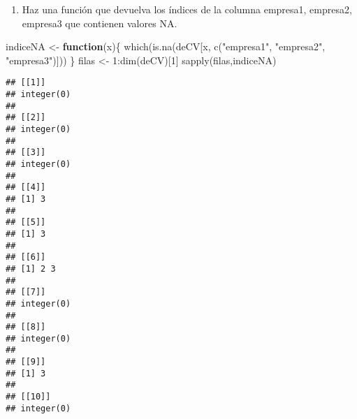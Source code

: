 \documentclass[
]{book}
\newenvironment{Shaded}{\begin{snugshade}}{\end{snugshade}}
\newcommand{\CommentTok}[1]{\textcolor[rgb]{0.56,0.35,0.01}{\textit{#1}}}
\newcommand{\ControlFlowTok}[1]{\textcolor[rgb]{0.13,0.29,0.53}{\textbf{#1}}}
\newcommand{\DecValTok}[1]{\textcolor[rgb]{0.00,0.00,0.81}{#1}}
\newcommand{\FunctionTok}[1]{\textcolor[rgb]{0.00,0.00,0.00}{#1}}
\newcommand{\NormalTok}[1]{#1}
\newcommand{\OtherTok}[1]{\textcolor[rgb]{0.56,0.35,0.01}{#1}}
\newcommand{\SpecialCharTok}[1]{\textcolor[rgb]{0.00,0.00,0.00}{#1}}
\newcommand{\StringTok}[1]{\textcolor[rgb]{0.31,0.60,0.02}{#1}}
\providecommand{\tightlist}{%
  \setlength{\itemsep}{0pt}\setlength{\parskip}{0pt}}
\begin{document}
\begin{Shaded}
\end{Shaded}

\begin{enumerate}
\def\labelenumi{\arabic{enumi}.}
\setcounter{enumi}{12}
\tightlist
\item
  Haz una función que devuelva los índices de la columna empresa1, empresa2, empresa3 que contienen
  valores NA.
\end{enumerate}

\begin{Shaded}
\begin{Highlighting}[]
\NormalTok{indiceNA }\OtherTok{\textless{}{-}} \ControlFlowTok{function}\NormalTok{(x)\{}
  \FunctionTok{which}\NormalTok{(}\FunctionTok{is.na}\NormalTok{(deCV[x, }\FunctionTok{c}\NormalTok{(}\StringTok{"empresa1"}\NormalTok{, }\StringTok{"empresa2"}\NormalTok{, }\StringTok{"empresa3"}\NormalTok{)]))}
\NormalTok{\}}
\NormalTok{filas }\OtherTok{\textless{}{-}} \DecValTok{1}\SpecialCharTok{:}\FunctionTok{dim}\NormalTok{(deCV)[}\DecValTok{1}\NormalTok{]}
\FunctionTok{sapply}\NormalTok{(filas,indiceNA)}
\end{Highlighting}
\end{Shaded}

\begin{verbatim}
## [[1]]
## integer(0)
## 
## [[2]]
## integer(0)
## 
## [[3]]
## integer(0)
## 
## [[4]]
## [1] 3
## 
## [[5]]
## [1] 3
## 
## [[6]]
## [1] 2 3
## 
## [[7]]
## integer(0)
## 
## [[8]]
## integer(0)
## 
## [[9]]
## [1] 3
## 
## [[10]]
## integer(0)
\end{verbatim}
\end{document}
